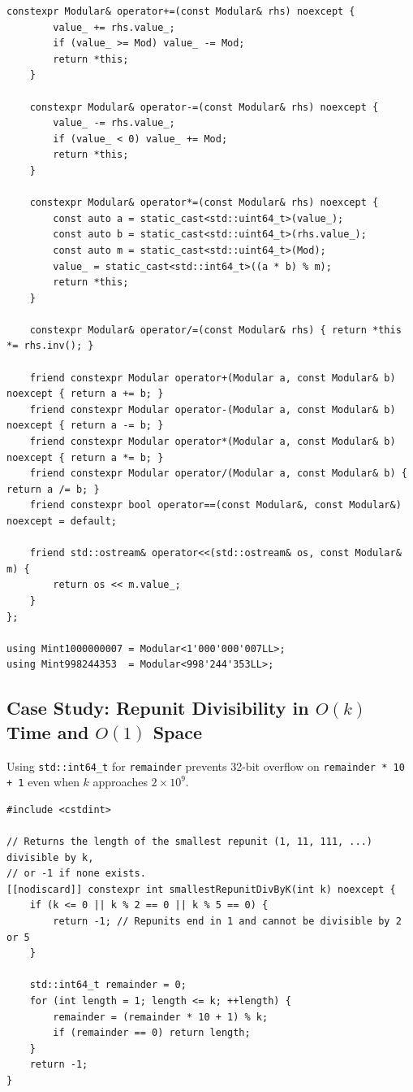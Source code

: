 \documentclass[11pt,a4paper]{article}
\theoremstyle{definition}
\begin{document}
\begin{lstlisting}[caption={Overflow-Checked C++23 Modular<Mod> Value Class}]
    constexpr Modular& operator+=(const Modular& rhs) noexcept {
        value_ += rhs.value_;
        if (value_ >= Mod) value_ -= Mod;
        return *this;
    }

    constexpr Modular& operator-=(const Modular& rhs) noexcept {
        value_ -= rhs.value_;
        if (value_ < 0) value_ += Mod;
        return *this;
    }

    constexpr Modular& operator*=(const Modular& rhs) noexcept {
        const auto a = static_cast<std::uint64_t>(value_);
        const auto b = static_cast<std::uint64_t>(rhs.value_);
        const auto m = static_cast<std::uint64_t>(Mod);
        value_ = static_cast<std::int64_t>((a * b) % m);
        return *this;
    }

    constexpr Modular& operator/=(const Modular& rhs) { return *this *= rhs.inv(); }

    friend constexpr Modular operator+(Modular a, const Modular& b) noexcept { return a += b; }
    friend constexpr Modular operator-(Modular a, const Modular& b) noexcept { return a -= b; }
    friend constexpr Modular operator*(Modular a, const Modular& b) noexcept { return a *= b; }
    friend constexpr Modular operator/(Modular a, const Modular& b) { return a /= b; }
    friend constexpr bool operator==(const Modular&, const Modular&) noexcept = default;

    friend std::ostream& operator<<(std::ostream& os, const Modular& m) {
        return os << m.value_;
    }
};

using Mint1000000007 = Modular<1'000'000'007LL>;
using Mint998244353  = Modular<998'244'353LL>;
\end{lstlisting}

\subsection{Case Study: Repunit Divisibility in $O(k)$ Time and $O(1)$ Space}

Using \texttt{std::int64\_t} for \texttt{remainder} prevents 32-bit overflow on \texttt{remainder * 10 + 1} even when $k$ approaches $2 \times 10^9$.

\begin{lstlisting}[caption={Overflow-Safe O(k) Repunit Divisibility via Modular Recurrence}]
#include <cstdint>

// Returns the length of the smallest repunit (1, 11, 111, ...) divisible by k,
// or -1 if none exists.
[[nodiscard]] constexpr int smallestRepunitDivByK(int k) noexcept {
    if (k <= 0 || k % 2 == 0 || k % 5 == 0) {
        return -1; // Repunits end in 1 and cannot be divisible by 2 or 5
    }

    std::int64_t remainder = 0;
    for (int length = 1; length <= k; ++length) {
        remainder = (remainder * 10 + 1) % k;
        if (remainder == 0) return length;
    }
    return -1;
}
\end{lstlisting}
\end{document}
